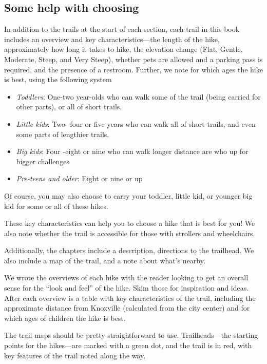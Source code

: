 \documentclass[
  letterpaper,
  DIV=11,
  numbers=noendperiod]{scrreprt}
\providecommand{\tightlist}{%
  \setlength{\itemsep}{0pt}\setlength{\parskip}{0pt}}\usepackage{longtable,booktabs,array}
\begin{document}
\subsection{Some help with choosing}\label{some-help-with-choosing}

In addition to the trails at the start of each section, each trail in
this book includes an overview and key characteristics---the length of
the hike, approximately how long it takes to hike, the elevation change
(Flat, Gentle, Moderate, Steep, and Very Steep), whether pets are
allowed and a parking pass is required, and the presence of a restroom.
Further, we note for which ages the hike is best, using the following
system

\begin{itemize}
\tightlist
\item
  \emph{Toddlers}: One-two year-olds who can walk some of the trail
  (being carried for other parts), or all of short trails.
\item
  \emph{Little kids}: Two- four or five years who can walk all of short
  trails, and even some parts of lengthier trails.
\item
  \emph{Big kids}: Four -eight or nine who can walk longer distance are
  who up for bigger challenges
\item
  \emph{Pre-teens and older}: Eight or nine or up
\end{itemize}

Of course, you may also choose to carry your toddler, little kid, or
younger big kid for some or all of these hikes.

These key characteristics can help you to choose a hike that is best for
you! We also note whether the trail is accessible for those with
strollers and wheelchairs.

Additionally, the chapters include a description, directions to the
trailhead. We also include a map of the trail, and a note about what's
nearby.

We wrote the overviews of each hike with the reader looking to get an
overall sense for the ``look and feel'' of the hike. Skim those for
inspiration and ideas. After each overview is a table with key
characteristics of the trail, including the approximate distance from
Knoxville (calculated from the city center) and for which ages of
children the hike is best.

The trail maps should be pretty straightforward to use. Trailheads---the
starting points for the hikes---are marked with a green dot, and the
trail is in red, with key features of the trail noted along the way.
\end{document}
